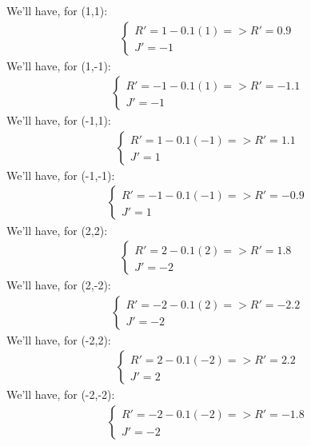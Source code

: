 \documentclass[12pt]{article}
\begin{document}
\begin{enumerate}[label=\alph*.]
    We'll have, for (1,1):
    \begin{align*}
        \begin{cases}
        R' = 1 - 0.1(1) => R' = 0.9 \\
        J' = -1
        \end{cases}
    \end{align*}
    We'll have, for (1,-1):
    \begin{align*}
        \begin{cases}
        R' = -1 - 0.1(1) => R' = -1.1 \\
        J' = -1
        \end{cases}
    \end{align*}
    We'll have, for (-1,1):
    \begin{align*}
        \begin{cases}
        R' = 1 - 0.1(-1) => R' = 1.1 \\
        J' = 1
        \end{cases}
    \end{align*}
    We'll have, for (-1,-1):
    \begin{align*}
        \begin{cases}
        R' = -1 - 0.1(-1) => R' = -0.9 \\
        J' = 1
        \end{cases}
    \end{align*}
    We'll have, for (2,2):
    \begin{align*}
        \begin{cases}
        R' = 2 - 0.1(2) => R' = 1.8 \\
        J' = -2
        \end{cases}
    \end{align*}
    We'll have, for (2,-2):
    \begin{align*}
        \begin{cases}
        R' = -2 - 0.1(2) => R' = -2.2 \\
        J' = -2
        \end{cases}
    \end{align*}
    We'll have, for (-2,2):
    \begin{align*}
        \begin{cases}
        R' = 2 - 0.1(-2) => R' = 2.2 \\
        J' = 2
        \end{cases}
    \end{align*}
    We'll have, for (-2,-2):
    \begin{align*}
        \begin{cases}
        R' = -2 - 0.1(-2) => R' = -1.8 \\
        J' = -2
        \end{cases}
    \end{align*}


\end{enumerate}
\end{document}
